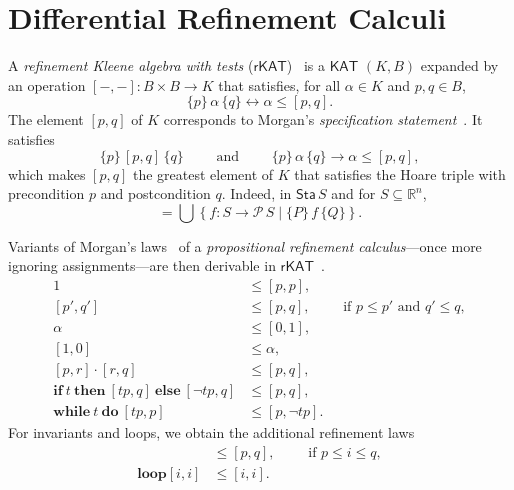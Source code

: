 \documentclass[envcountsame]{llncs}
\newcommand{\IF}[3]{\mathbf{if}\ #1\ \mathbf{then}\ #2\ \mathbf{else}\ #3}
\newcommand{\WHILE}[2]{\mathbf{while}\ #1\ \mathbf{do}\ #2}
\newcommand{\KAT}{\mathsf{KAT}}
\newcommand{\rKAT}{\mathsf{rKAT}}
\newcommand{\Pow}{\mathcal{P}}
\newcommand{\reals}{\mathbb{R}}
\newcommand{\sta}{\mathsf{Sta}}
\begin{document}

\section{Differential Refinement Calculi}\label{sec:refine}

A \emph{refinement Kleene algebra with tests}
($\rKAT$)~\cite{ArmstrongGS16}  is a $\KAT$
$(K,B)$ expanded by an operation $[-,-]:B\times B\to K$ that
satisfies, for all $\alpha \in K$ and $p,q\in B$, 
\begin{equation*}
  \{p\}\, \alpha\, \{q\} \leftrightarrow \alpha\le [p,q].
\end{equation*}
The element $[p,q]$ of $K$ corresponds to Morgan's \emph{specification
  statement}~\cite{Morgan94}. It satisfies
\begin{equation*}
  \{p\}\, [p,q]\, \{q\}\qquad \text{ and }\qquad \{p\}\, \alpha\, \{q\} \rightarrow \alpha\le [p,q],
\end{equation*}
which makes $[p,q]$ the greatest element of $K$ that satisfies the Hoare
triple with precondition $p$ and postcondition $q$.  Indeed, in
$\sta\, S$ and for $S\subseteq \reals^n$,
\begin{equation*}
  [P,Q] = \bigcup \left\{f:S\to \Pow\, S \mid \{P\}\, f\, \{Q\}\right\}.
\end{equation*}

Variants of Morgan's laws~\cite{Morgan94} of a \emph{propositional
  refinement calculus}---once more ignoring assignments---are then derivable in
$\rKAT$~\cite{ArmstrongGS16}.
\begin{align}
  1 &\le [p,p],\label{eq:r-skip}\tag{r-skip}\\
[p',q'] &\le [p,q],\qquad \text{ if } p\le p'\text{ and } q'\le q,\label{eq:r-cons}\tag{r-cons}\\
\alpha & \le [0,1],\\
[1,0] &\le \alpha,\\
[p,r]\cdot [r,q] &\le [p,q],\label{eq:r-seq}\tag{r-seq}\\
\IF{t}{[tp,q]}{[\neg tp,q]} &\le [p,q],\label{eq:r-cond}\tag{r-cond}\\
 \WHILE{t}{[tp,p]} &\le [p,\neg tp]. \label{eq:r-while}\tag{r-while}
\end{align}
For invariants and loops, we obtain the additional refinement laws
\begin{align}
  [i,i] &\le [p,q],\qquad \text{ if } p\le i \le q,\label{eq:r-inv}\tag{r-inv}\\
\mathbf{loop} [i,i] &\le [i,i]. \label{eq:r-loop}\tag{r-loop}
\end{align}
\end{document}
